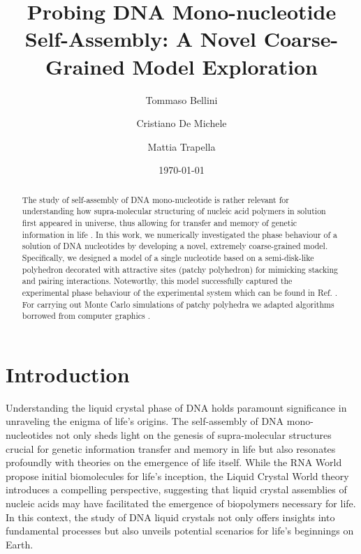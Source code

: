 \documentclass[aip,jcp, amsmath, amssymb, reprint]{revtex4-1}
\begin{document}
\title{Probing DNA Mono-nucleotide Self-Assembly: A Novel Coarse-Grained Model Exploration}
\date{\today}

\author{Tommaso Bellini}
\author{Cristiano De Michele}
\author{Mattia Trapella}

\begin{abstract}
The study of self-assembly of DNA mono-nucleotide is rather relevant for understanding how supra-molecular structuring of nucleic acid polymers in solution first appeared in universe, thus allowing for transfer and memory of genetic information in life \cite{Jia}. In this work, we numerically investigated the phase behaviour of a solution of DNA nucleotides by developing a novel, extremely coarse-grained model. Specifically, we designed a model of a single nucleotide based on a semi-disk-like polyhedron decorated with attractive sites (patchy polyhedron) for mimicking stacking and pairing interactions. Noteworthy, this model successfully captured the experimental phase behaviour of the experimental system which can be found in Ref. \cite{Smith}. For carrying out Monte Carlo simulations of patchy polyhedra we adapted algorithms borrowed from computer graphics \cite{libccd}.
\end{abstract}

\maketitle


\section{Introduction}
Understanding the liquid crystal phase of DNA holds paramount significance in unraveling the enigma of life's origins. The self-assembly of DNA mono-nucleotides not only sheds light on the genesis of supra-molecular structures crucial for genetic information transfer and memory in life but also resonates profoundly with theories on the emergence of life itself\cite{Jia}. While the RNA World propose initial biomolecules for life's inception, the Liquid Crystal World theory introduces a compelling perspective, suggesting that liquid crystal assemblies of nucleic acids may have facilitated the emergence of biopolymers necessary for life. In this context, the study of DNA liquid crystals not only offers insights into fundamental processes but also unveils potential scenarios for life's beginnings on Earth.  \\
\end{document}

